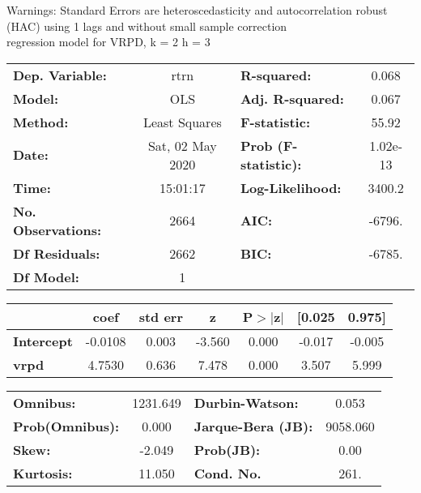 Warnings: \newline
 [1] Standard Errors are heteroscedasticity and autocorrelation robust (HAC) using 1 lags and without small sample correction\\ 

regression model for VRPD, k = 2 h = 3\begin{center}
\begin{tabular}{lclc}
\toprule
\textbf{Dep. Variable:}    &       rtrn       & \textbf{  R-squared:         } &     0.068   \\
\textbf{Model:}            &       OLS        & \textbf{  Adj. R-squared:    } &     0.067   \\
\textbf{Method:}           &  Least Squares   & \textbf{  F-statistic:       } &     55.92   \\
\textbf{Date:}             & Sat, 02 May 2020 & \textbf{  Prob (F-statistic):} &  1.02e-13   \\
\textbf{Time:}             &     15:01:17     & \textbf{  Log-Likelihood:    } &    3400.2   \\
\textbf{No. Observations:} &        2664      & \textbf{  AIC:               } &    -6796.   \\
\textbf{Df Residuals:}     &        2662      & \textbf{  BIC:               } &    -6785.   \\
\textbf{Df Model:}         &           1      & \textbf{                     } &             \\
\bottomrule
\end{tabular}
\begin{tabular}{lcccccc}
                   & \textbf{coef} & \textbf{std err} & \textbf{z} & \textbf{P$> |$z$|$} & \textbf{[0.025} & \textbf{0.975]}  \\
\midrule
\textbf{Intercept} &      -0.0108  &        0.003     &    -3.560  &         0.000        &       -0.017    &       -0.005     \\
\textbf{vrpd}      &       4.7530  &        0.636     &     7.478  &         0.000        &        3.507    &        5.999     \\
\bottomrule
\end{tabular}
\begin{tabular}{lclc}
\textbf{Omnibus:}       & 1231.649 & \textbf{  Durbin-Watson:     } &    0.053  \\
\textbf{Prob(Omnibus):} &   0.000  & \textbf{  Jarque-Bera (JB):  } & 9058.060  \\
\textbf{Skew:}          &  -2.049  & \textbf{  Prob(JB):          } &     0.00  \\
\textbf{Kurtosis:}      &  11.050  & \textbf{  Cond. No.          } &     261.  \\
\bottomrule
\end{tabular}
\end{center}

